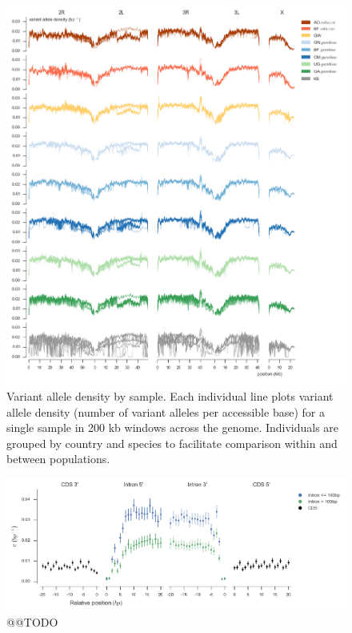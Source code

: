 \documentclass[a4paper,11pt,abstracton,hidelinks]{scrartcl}
\begin{document}
\clearpage
\begin{figure}[h]
\centering
\includegraphics[width=1.1\textwidth,center]{artwork/chapter3/sample_variant_density.pdf}
\caption{Variant allele density by sample.
%
Each individual line plots variant allele density (number of variant alleles per accessible base) for a single sample in 200 kb windows across the genome.
%
Individuals are grouped by country and species to facilitate comparison within and between populations.
}
%
\label{fig:sample_variant_density}
\end{figure}


\clearpage
\begin{figure}[h]
\centering
\includegraphics[width=1.1\textwidth,center]{artwork/chapter3/splicing_pi.png}
\caption{@@TODO
}
%
\label{fig:splicing_pi}
\end{figure}
\end{document}
